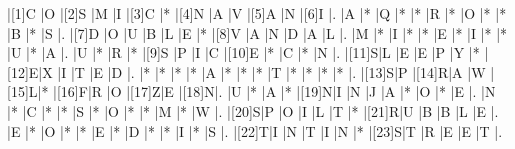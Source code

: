 \vfill
\begin{Puzzle}{13}{13}
|[1]C |O |[2]S |M |I    |[3]C |*  |[4]N |A     |V |[5]A |N |[6]I |.
|A    |* |Q    |* |*    |R    |*  |O    |*     |* |B    |* |S    |.
|[7]D |O |U    |B |L    |E    |*  |[8]V |A     |N |D    |A |L    |.
|M    |* |I    |* |*    |E    |*  |I    |*     |* |U    |* |A    |.
|U    |* |R    |* |[9]S |P    |I  |C    |[10]E |* |C    |* |N    |.
|[11]S|L |E    |E |P    |Y    |*  |[12]E|X     |I |T    |E |D    |.
|*    |* |*    |* |A    |*    |*  |*    |T     |* |*    |* |*    |.
|[13]S|P |[14]R|A |W    |[15]L|*  |[16]F|R     |O |[17]Z|E |[18]N|.
|U    |* |A    |* |[19]N|I    |N  |J    |A     |* |O    |* |E    |.
|N    |* |C    |* |*    |S    |*  |O    |*     |* |M    |* |W    |.
|[20]S|P |O    |I |L    |T    |*  |[21]R|U     |B |B    |L |E    |.
|E    |* |O    |* |*    |E    |*  |D    |*     |* |I    |* |S    |.
|[22]T|I |N    |T |I    |N    |*  |[23]S|T     |R |E    |E |T    |.
\end{Puzzle}

\newcommand{\blnk}{\underline{\hspace{2em}}}

